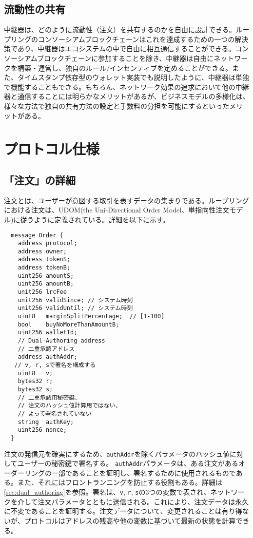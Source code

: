 \documentclass{article}
\begin{document}
\begin{multicols}{2}
\subsection{流動性の共有\label{sec:liquidity_sharing}}
中継器は、どのように流動性（注文）を共有するのかを自由に設計できる。ループリングのコンソーシアムブロックチェーンはこれを達成するための一つの解決策であり、中継器はエコシステムの中で自由に相互通信することができる。コンソーシアムブロックチェーンに参加することを除き、中継器は自由にネットワークを構築・運営し、独自のルール/インセンティブを定めることができる。また、タイムスタンプ依存型のウォレット実装でも説明したように、中継器は単独で機能することもできる。もちろん、ネットワーク効果の追求において他の中継器と通信することには明らかなメリットがあるが、ビジネスモデルの多様化は、様々な方法で独自の共有方法の設定と手数料の分担を可能にするといったメリットがある。 


\section{プロトコル仕様\label{sec:protocol}}

\subsection{「注文」の詳細\label{anatomy}}
注文とは、ユーザーが意図する取引を表すデータの集まりである。ループリングにおける注文は、UDOM(the Uni-Directional Order Model、単指向性注文モデル)に従うように定義されている。詳細を以下に示す。

\begin{verbatim}
  message Order {
    address protocol;
    address owner;
    address tokenS;
    address tokenB;
    uint256 amountS;
    uint256 amountB;
    unit256 lrcFee
    unit256 validSince; // システム時刻
    unit256 validUntil; // システム時刻
    uint8   marginSplitPercentage;  // [1-100]
    bool    buyNoMoreThanAmountB;
    uint256 walletId;
    // Dual-Authoring address
    // 二重承認アドレス
    address authAddr;
   // v, r, sで署名を構成する
    uint8   v;       
    bytes32 r;
    bytes32 s;
    // 二重承認用秘密鍵、
    // 注文のハッシュ値計算用ではない、
    // よって署名されていない
    string  authKey; 
    uint256 nonce;         
  }
\end{verbatim}

注文の発信元を確実にするため、\verb|authAddr|を除くパラメータのハッシュ値に対してユーザーの秘密鍵で署名する。 \verb|authAddr|パラメータは、ある注文があるオーダーリングの一部であることを証明し、署名するために使用されるものである。また、それにはフロントランニングを防止する役割もある。詳細は \ref{sec:dual_authoring}を参照。署名は、\verb|v|, \verb|r|, \verb|s|の3つの変数で表され、ネットワークを介して注文パラメータとともに送信される。これにより、注文データは永久に不変であることを証明する。注文データについて、変更されることは有り得ないが、プロトコルはアドレスの残高や他の変数に基づいて最新の状態を計算できる。


\end{multicols}
\end{document}
